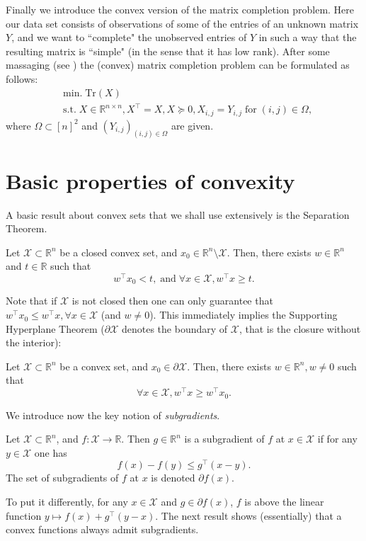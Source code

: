 \documentclass[openany]{now}
\newcommand{\R}{\mathbb{R}}
\newcommand{\cX}{\mathcal{X}}
\begin{document}
Finally we introduce the convex version of the matrix completion problem. Here our data set consists of observations of some of the entries of an unknown matrix $Y$, and we want to ``complete" the unobserved entries of $Y$ in such a way that the resulting matrix is ``simple" (in the sense that it has low rank). After some massaging (see \cite{CR09}) the (convex) matrix completion problem can be formulated as follows:
\begin{align*}
& \mathrm{min.} \; \mathrm{Tr}(X) \\
& \text{s.t.} \; X \in \R^{n \times n}, X^{\top} = X, X \succeq 0, X_{i,j} = Y_{i,j} \; \text{for} \; (i,j) \in \Omega ,
\end{align*}
where $\Omega \subset [n]^2$ and $(Y_{i,j})_{(i,j) \in \Omega}$ are given. 

\section{Basic properties of convexity}
A basic result about convex sets that we shall use extensively is the Separation Theorem.

\begin{theorem}
Let $\mathcal{X} \subset \R^n$ be a closed convex set, and $x_0 \in \R^n \setminus \mathcal{X}$. Then, there exists $w \in \R^n$ and $t \in \R$ such that
$$w^{\top} x_0 < t, \; \text{and} \; \forall x \in \mathcal{X}, w^{\top} x \geq t.$$
\end{theorem}

Note that if $\mathcal{X}$ is not closed then one can only guarantee that $w^{\top} x_0 \leq w^{\top} x, \forall x \in \mathcal{X}$ (and $w \neq 0$). This immediately implies the Supporting Hyperplane Theorem ($\partial \cX$ denotes the boundary of $\cX$, that is the closure without the interior):

\begin{theorem}
Let $\mathcal{X} \subset \R^n$ be a convex set, and $x_0 \in \partial \mathcal{X}$. Then, there exists $w \in \R^n, w \neq 0$ such that
$$\forall x \in \mathcal{X}, w^{\top} x \geq w^{\top} x_0.$$
\end{theorem}

We introduce now the key notion of {\em subgradients}.

\begin{definition}[Subgradients]
Let $\mathcal{X} \subset \R^n$, and $f : \mathcal{X} \rightarrow \R$. Then $g \in \R^n$ is a subgradient of $f$ at $x \in \mathcal{X}$ if for any $y \in \mathcal{X}$ one has
$$f(x) - f(y) \leq g^{\top} (x - y) .$$
The set of subgradients of $f$ at $x$ is denoted $\partial f (x)$.
\end{definition}
To put it differently, for any $x \in \cX$ and $g \in \partial f(x)$, $f$ is above the linear function $y \mapsto f(x) + g^{\top} (y-x)$. The next result shows (essentially) that a convex functions always admit subgradients.
\end{document}
